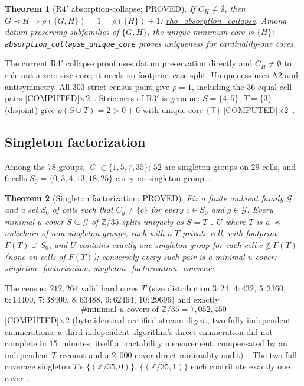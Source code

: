 \documentclass[11pt,a4paper]{article}
\newtheorem{theorem}{Theorem}
\theoremstyle{definition}
\begin{document}
\begin{theorem}[R4$'$ absorption-collapse; PROVED]
  \label{thm:r4p}
  If $C_H\ne\emptyset$, then
  $G\prec H\Rightarrow\rho(\{G,H\})=1=\rho(\{H\})+1$:
  \url{rho_absorption_collapse}. Among datum-preserving subfamilies of
  $\{G,H\}$, the unique minimum core is $\{H\}$:
  \texttt{absorption\_collapse\_unique\_core} proves uniqueness for
  cardinality-one cores.
\end{theorem}

The current R4$'$ collapse proof uses datum preservation directly and
$C_H\ne\emptyset$ to rule out a zero-size core; it needs no footprint case
split. Uniqueness uses A2 and antisymmetry. All $303$ strict census pairs give $\rho=1$,
including the $36$ equal-cell pairs [COMPUTED]$\times2$~\cite{D315}.
Strictness of R3$'$ is genuine: $S=\{4,5\}$, $T=\{3\}$ (disjoint) give
$\rho(S\cup T)=2>0+0$ with unique core $\{\top\}$
[COMPUTED]$\times2$~\cite{D315}.

\subsection{Singleton factorization}
\label{sec:fact}

Among the $78$ groups, $|C|\in\{1,5,7,35\}$; $52$ are singleton groups on
$29$ cells, and $6$ cells $S_0=\{0,3,4,13,18,25\}$ carry no singleton
group~\cite{D312}.

\begin{theorem}[Singleton factorization; PROVED]
  \label{thm:factorization}
  Fix a finite ambient family $\mathcal G$ and a set $S_0$ of cells such that
  $C_g\ne\{c\}$ for every $c\in S_0$ and $g\in\mathcal G$.
  Every minimal $u$-cover $S\subseteq\mathcal G$ of $\mathbb{Z}/35$ splits
  uniquely as $S=T\cup U$ where $T$ is a $\preceq$-antichain of non-singleton groups,
  each with a $T$-private cell, with footprint $F(T)\supseteq S_0$, and $U$
  contains exactly one singleton group for each cell $c\notin F(T)$ (none
  on cells of $F(T)$); conversely every such pair is a minimal $u$-cover:
  \url{singleton_factorization},
  \url{singleton_factorization_converse}.
\end{theorem}

The census: $212{,}264$ valid hard cores $T$ (size distribution
$3{:}24$, $4{:}432$, $5{:}3360$, $6{:}14400$, $7{:}38400$, $8{:}63488$,
$9{:}62464$, $10{:}29696$) and exactly
\begin{equation}
  \label{eq:ucount}
  \#\text{minimal }u\text{-covers of }\mathbb{Z}/35 = 7{,}052{,}450
\end{equation}
[COMPUTED]$\times2$ (byte-identical certified stream digest, two fully
independent enumerations; a third independent algorithm's direct
enumeration did not complete in $15$~minutes, itself a tractability
measurement, compensated by an independent $T$-recount and a $2{,}000$-cover
direct-minimality audit)~\cite{D312}.  The two full-coverage singleton $T$'s
$\{(\mathbb{Z}/35,0)\}$, $\{(\mathbb{Z}/35,1)\}$ each contribute exactly one
cover~\cite{D312}.
\end{document}

